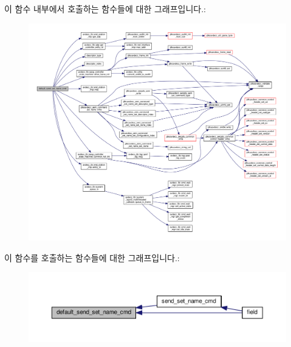 이 함수 내부에서 호출하는 함수들에 대한 그래프입니다.\+:
\nopagebreak
\begin{figure}[H]
\begin{center}
\leavevmode
\includegraphics[width=350pt]{classavdecc__lib_1_1descriptor__base__imp_aed899a0eaaaa06a02569135f844ffce8_cgraph}
\end{center}
\end{figure}




이 함수를 호출하는 함수들에 대한 그래프입니다.\+:
\nopagebreak
\begin{figure}[H]
\begin{center}
\leavevmode
\includegraphics[width=350pt]{classavdecc__lib_1_1descriptor__base__imp_aed899a0eaaaa06a02569135f844ffce8_icgraph}
\end{center}
\end{figure}


